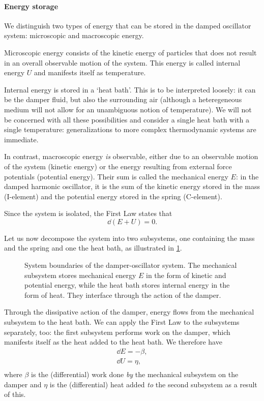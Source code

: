 \paragraph{Energy storage} We distinguish two types of energy that can be stored in the damped oscillator system: microscopic and macroscopic energy.

Microscopic energy consists of the kinetic energy of particles that does not result in an overall observable motion of the system. This energy is called internal energy $U$ and manifests itself as temperature. 

Internal energy is stored in a `heat bath'. This is to be interpreted loosely: it can be the damper fluid, but also the surrounding air (although a heteregeneous medium will not allow for an unambiguous notion of temperature). We will not be concerned with all these possibilities and consider a single heat bath with a single temperature: generalizations to more complex thermodynamic systems are immediate. 

In contrast, macroscopic energy \emph{is} observable, either due to an observable motion of the system (kinetic energy) or the energy resulting from external force potentials (potential energy). Their sum is called the mechanical energy $E$: in the damped harmonic oscillator, it is the sum of the kinetic energy stored in the mass (I-element) and the potential energy stored in the spring (C-element).

Since the system is isolated, the First Law states that 
\begin{equation}
    \dd{(E + U)} = 0. 
    \label{eq:dho_first_law}
\end{equation}

Let us now decompose the system into two subsystems, one containing the mass and the spring and one the heat bath, as illustrated in \cref{fig:oscillator_thermo}. 
\begin{figure}[ht!]
    \centering
    
    \caption{System boundaries of the damper-oscillator system. The mechanical subsystem stores mechanical energy $E$ in the form of kinetic and potential energy, while the heat bath stores internal energy in the form of heat. They interface through the action of the damper.}
    \label{fig:oscillator_thermo}
\end{figure}

Through the dissipative action of the damper, energy flows from the mechanical subsystem to the heat bath. We can apply the First Law to the subsystems separately, too: the first subsystem performs work on the damper, which manifests itself as the heat added to the heat bath. We therefore have
\begin{equation}
    \begin{split}
        \dd{E}  = -\beta, \\[0.2cm]
        \dd{U} = \eta, \\
    \end{split}
    \label{eq:dho_energy_balance}
\end{equation}
where $\beta$ is the (differential) work done \emph{by} the mechanical subsystem on the damper and $\eta$ is the (differential) heat added \emph{to} the second subsystem as a result of this. 

